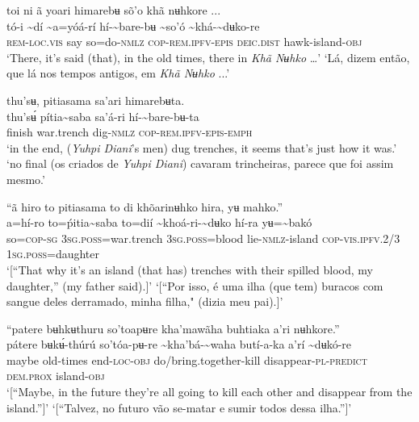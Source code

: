 \documentclass[output=paper,
modfonts,nonflat
]{langsci/langscibook}
\begin{document}
\ea toi ni ã yoari himarebʉ sõ'o khã nʉhkore ...  \\[.3em]
\gll tó-i	{\textasciitilde}dí	{\textasciitilde}a=yóá-rí	hí-{\textasciitilde}bare-bʉ	{\textasciitilde}so'ó	{\textasciitilde}khá-{\textasciitilde}dʉko-re \\
     \textsc{rem-loc.vis}	say	so=do\textsc{-nmlz}	\textsc{cop-rem.ipfv-epis}	\textsc{deic.dist}	hawk-island\textsc{-obj}\\
\glt ‘There, it's said (that), in the old times, there in \textit{Khã Nʉhko} …’
\glt ‘Lá, dizem então, que lá nos tempos antigos, em \textit{Khã Nʉhko} ...’
\z 

\ea thu'sʉ, pitiasama sa'ari himarebʉta. \\[.3em]
\gll thu'sʉ́	pítia{\textasciitilde}saba	sa'á-ri	hí-{\textasciitilde}bare-bʉ-ta \\
     finish	war.trench	dig\textsc{-nmlz}	\textsc{cop-rem.ipfv-epis-emph} \\
\glt ‘in the end, (\textit{Yuhpi Diani}'s men) dug trenches, it seems that's just how it was.’
\glt ‘no final (os criados de \textit{Yuhpi Diani}) cavaram trincheiras, parece que foi assim mesmo.’
\z 

\ea “ã hiro to pitiasama to di khõarinʉhko hira, yʉ mahko.” \\[.3em]
\gll {\textasciitilde}a=hí-ro	to=ṕitia{\textasciitilde}saba	to=dií	{\textasciitilde}khoá-ri-{\textasciitilde}dʉko hí-ra	yʉ={\textasciitilde}bakó\\
     so=\textsc{cop-sg}	3\textsc{sg.poss}=war.trench	3\textsc{sg.poss}=blood	lie\textsc{-nmlz}-island \textsc{cop-vis.ipfv.}2/3	1\textsc{sg.poss}=daughter\\
\glt ‘[“That why it's an island (that has) trenches with their spilled blood, my daughter,” (my father said).{\footnotemark}]’
\glt ‘[“Por isso, é uma ilha (que tem) buracos com sangue deles derramado, minha filha," (dizia meu pai).]’
\z 

\ea “patere bʉhkʉthuru so'toapʉre kha'mawãha buhtiaka a’ri nʉhkore.” \\[.3em]
\gll pátere	bʉkʉ́-thúrú	so'tóa-pʉ-re	{\textasciitilde}kha'bá-{\textasciitilde}waha	butí-a-ka	a’rí	{\textasciitilde}dʉkó-re \\
     maybe	old-times	end\textsc{-loc-obj}	do/bring.together-kill	disappear\textsc{-pl-predict}	\textsc{dem.prox}	island\textsc{-obj}\\
\glt ‘[“Maybe, in the future they're all going to kill each other and disappear from the island.”]’
\glt ‘[“Talvez, no futuro vão se-matar e sumir todos dessa ilha.”]’
\z 
\end{document}
